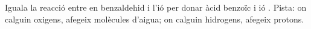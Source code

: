 \begin{exr}{}
Iguala la reacció entre en benzaldehid i l'ió  per donar àcid benzoïc i ió . Pista: on calguin oxigens, afegeix molècules d'aigua; on calguin hidrogens, afegeix protons.
\end{exr}
